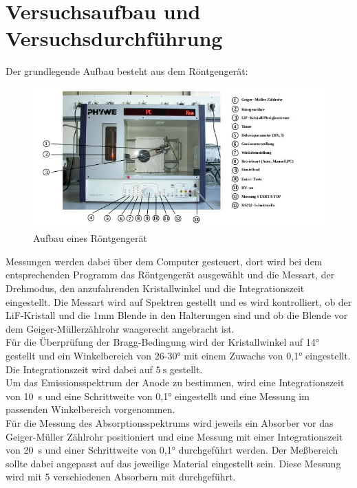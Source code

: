 \section{Versuchsaufbau und Versuchsdurchführung}\justifying

Der grundlegende Aufbau besteht aus dem Röntgengerät:\cite{V603}
\begin{figure}[H]
    \centering
    \includegraphics[width=\linewidth]{images/Aufbau1.jpg}
    \caption{Aufbau eines Röntgengerät}
    \label{fig:1}
\end{figure}
\justifying Messungen werden dabei über dem Computer gesteuert, dort wird bei dem entsprechenden Programm
das Röntgengerät ausgewählt und die Messart, der Drehmodus, den anzufahrenden Kristallwinkel und die 
Integrationszeit eingestellt. Die Messart wird auf Spektren gestellt und es wird kontrolliert, ob der
LiF-Kristall und die 1mm Blende in den Halterungen sind und ob die Blende vor dem Geiger-Müllerzählrohr
waagerecht angebracht ist. \\
Für die Überprüfung der Bragg-Bedingung wird der Kristallwinkel auf 14° gestellt und ein Winkelbereich von 26-30°
mit einem Zuwachs von 0,1° eingestellt. Die Integrationszeit wird dabei auf $\SI{5}{\second}$ gestellt.\\
Um das Emissionsspektrum der Anode zu bestimmen, wird eine Integrationszeit von \SI{10}{\second} und
eine Schrittweite von 0,1° eingestellt und eine Messung im passenden Winkelbereich vorgenommen.\\
Für die Messung des Absorptionsspektrums wird jeweils ein Absorber vor das Geiger-Müller Zählrohr positioniert
und eine Messung mit einer Integrationszeit von \SI{20}{\second} und einer Schrittweite von 0,1° durchgeführt werden.
Der Meßbereich sollte dabei angepasst auf das jeweilige Material eingestellt sein. Diese Messung 
wird mit 5 verschiedenen Absorbern mit durchgeführt.

